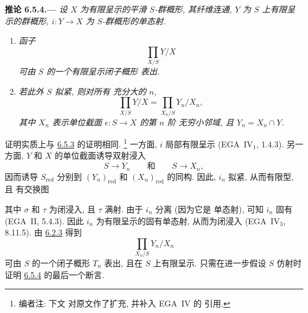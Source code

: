 
\medskip
{}\label{cor:sga3-VIB-6.5.4}%
\noindent\textbf{推论 6.5.4.---}
\emph{设 \(X\) 为有限呈示的平滑 \(S\)-群概形,
其纤维连通, \(Y\) 为 \(S\) 上有限呈示的群概形,
\(i:Y\to X\) 为
\(S\)-群概形的单态射.}
\begin{enumerate}
\item[\textup{(i)}]\label{concl:sga3-VIB-6.5.4-i}
  \emph{函子
  \[
    \prod_{X/S}Y/X
  \]
  可由 \(S\) 的一个有限呈示闭子概形
  表出.}
\item[\textup{(ii)}]\label{concl:sga3-VIB-6.5.4-ii}
  \emph{若此外 \(S\) 拟紧, 则对所有
  充分大的 \(n\),
  \[
    \prod_{X/S}Y/X
      =\prod_{X_n/S}Y_n/X_n,
  \]
  其中 \(X_n\) 表示单位截面 \(\epsilon:S\to X\) 的第 \(n\) 阶
  无穷小邻域, 且
  \(Y_n=X_n\cap Y\).}
\end{enumerate}

证明实质上与
\hyperref[cor:sga3-VIB-6.5.3]{6.5.3} 的证明相同.%
\footnote{\label{note:sga3-VIB-65}编者注: 下文
对原文作了扩充, 并补入 EGA~IV 的
引用.}
一方面, \(i\) 局部有限呈示
(EGA~IV\(_1\), 1.4.3). 另一方面, \(Y\)
和 \(X\) 的单位截面诱导双射浸入
\[
  S\longrightarrow Y_n
  \qquad\text{和}\qquad
  S\longrightarrow X_n,
\]
因而诱导 \(S_{\mathrm{red}}\) 分别到
\((Y_n)_{\mathrm{red}}\) 和 \((X_n)_{\mathrm{red}}\) 的同构.
因此, \(i_n\) 拟紧, 从而有限型, 且
有交换图
\begin{figure}[H]
  \centering
  \label{fig:sga3-VIB-6.5.4-reduced-triangle}%
\end{figure}
其中 \(\sigma\) 和 \(\tau\) 为闭浸入, 且 \(\tau\)
满射. 由于 \(i_n\) 分离 (因为它是
单态射), 可知 \(i_n\) 固有
(EGA~II, 5.4.3). 因此 \(i_n\) 为有限呈示的固有单态射,
从而为闭浸入
(EGA~IV\(_3\), 8.11.5). 由
\hyperref[thm:sga3-VIB-6.2.3]{6.2.3} 得到
\[
  \prod_{X_n/S}Y_n/X_n
\]
可由 \(S\) 的一个闭子概形 \(T_n\) 表出,
且在 \(S\) 上有限呈示. 只需在进一步假设 \(S\) 仿射时证明
\hyperref[cor:sga3-VIB-6.5.4]{6.5.4} 的最后一个断言.

